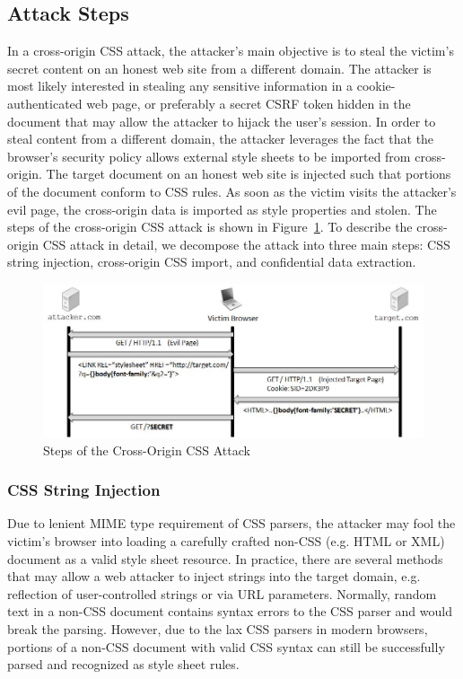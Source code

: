 \documentclass{acm_proc_article-sp}
\begin{document}
\subsection{Attack Steps}
In a cross-origin CSS attack, the attacker's main objective is to steal the victim's secret content on an honest web site from a different domain. The attacker is most likely interested in stealing any sensitive information in a cookie-authenticated web page, or preferably a secret CSRF token hidden in the document that may allow the attacker to hijack the user's session. In order to steal content from a different domain, the attacker leverages the fact that the browser's security policy allows external style sheets to be imported from cross-origin. The target document on an honest web site is injected such that portions of the document conform to CSS rules. As soon as the victim visits the attacker's evil page, the cross-origin data is imported as style properties and stolen. The steps of the cross-origin CSS attack is shown in Figure~\ref{figure:steps}. To describe the cross-origin CSS attack in detail, we decompose the attack into three main steps: CSS string injection, cross-origin CSS import, and confidential data extraction.

\begin{figure}
\centering
\includegraphics[width=\linewidth]{steps.jpg}
\caption{Steps of the Cross-Origin CSS Attack}
\label{figure:steps}
\end{figure}

\subsubsection{CSS String Injection}
Due to lenient MIME type requirement of CSS parsers, the attacker may fool the victim's browser into loading a carefully crafted non-CSS (e.g. HTML or XML) document as a valid style sheet resource. In practice, there are several methods that may allow a web attacker to inject strings into the target domain, e.g. reflection of user-controlled strings or via URL parameters. Normally, random text in a non-CSS document contains syntax errors to the CSS parser and would break the parsing. However, due to the lax CSS parsers in modern browsers, portions of a non-CSS document with valid CSS syntax can still be successfully parsed and recognized as style sheet rules.
\end{document}
